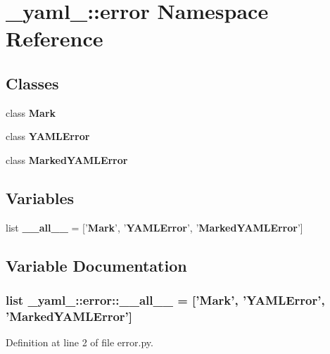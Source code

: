 \section{\_\-yaml\_\-::error Namespace Reference}
\label{namespace__yaml___1_1error}


\subsection*{Classes}
\begin{CompactItemize}
\item 
class {\bf Mark}
\item 
class {\bf YAMLError}
\item 
class {\bf MarkedYAMLError}
\end{CompactItemize}
\subsection*{Variables}
\begin{CompactItemize}
\item 
list {\bf \_\-\_\-all\_\-\_\-} = ['{\bf Mark}', '{\bf YAMLError}', '{\bf MarkedYAMLError}']
\end{CompactItemize}


\subsection{Variable Documentation}
\subsubsection{\setlength{\rightskip}{0pt plus 5cm}list {\bf \_\-yaml\_\-::error::\_\-\_\-all\_\-\_\-} = ['{\bf Mark}', '{\bf YAMLError}', '{\bf MarkedYAMLError}']\hspace{0.3cm}{\tt  [static]}}\label{namespace__yaml___1_1error_efd9df038bc4511a24bc8b2c7c34e433}




Definition at line 2 of file error.py.